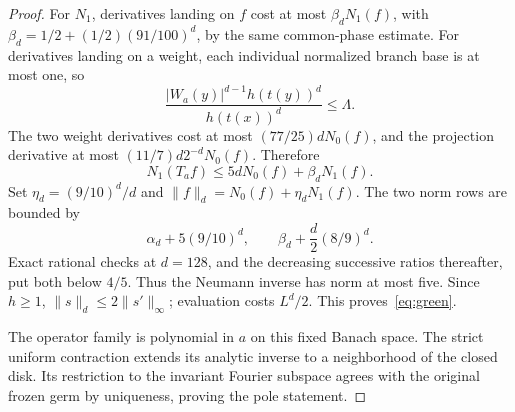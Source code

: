 \documentclass[11pt,a4paper]{article}
\theoremstyle{remark}\newtheorem*{ednote}{Editorial note (ProveIt, 2026-10-01)}
\begin{document}
\begin{proof}
For $N_1$, derivatives landing on $f$ cost at most
$\beta_dN_1(f)$, with $\beta_d=1/2+(1/2)(91/100)^d$, by the same common-phase estimate. For derivatives landing on a weight, each individual normalized branch base is at most one, so
\[
 \frac{|W_a(y)|^{d-1}h(t(y))^d}{h(t(x))^d}\le\Lambda.
\]
The two weight derivatives cost at most $(77/25)dN_0(f)$, and the projection derivative at most $(11/7)d2^{-d}N_0(f)$. Therefore
\begin{equation}\label{eq:norm1}
 N_1(T_af)\le5dN_0(f)+\beta_dN_1(f).
\end{equation}
Set $\eta_d=(9/10)^d/d$ and $\|f\|_d=N_0(f)+\eta_dN_1(f)$. The two norm rows are bounded by
\[
 \alpha_d+5(9/10)^d,\qquad
 \beta_d+\frac d2(8/9)^d.
\]
Exact rational checks at $d=128$, and the decreasing successive ratios thereafter, put both below $4/5$. Thus the Neumann inverse has norm at most five. Since $h\ge1$, $\|s\|_d\le2\|s'\|_\infty$; evaluation costs $L^d/2$. This proves~\eqref{eq:green}.

The operator family is polynomial in $a$ on this fixed Banach space. The strict uniform contraction extends its analytic inverse to a neighborhood of the closed disk. Its restriction to the invariant Fourier subspace agrees with the original frozen germ by uniqueness, proving the pole statement.
\end{proof}
\end{document}

